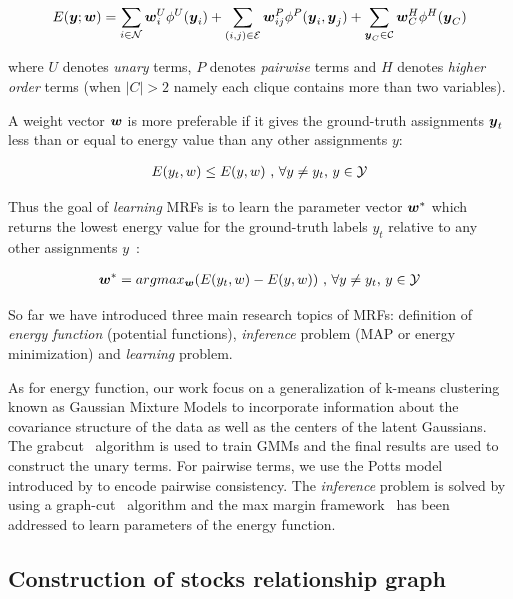\begin{align}
  \label{eq:energyfunction_UPH}
  E({\boldsymbol{y}};{\boldsymbol{w}})=\sum_{i\in {\cal N}}{{\boldsymbol{w}}_i^U\phi^U({\boldsymbol{y}}_i)}+
  \sum_{(i,j)\in {\cal E}}{{\boldsymbol{w}}_{ij}^P\phi^P({\boldsymbol{y}}_i,{\boldsymbol{y}}_j)}+
  \sum_{{\boldsymbol{y}}_C\in {\cal C}}{{\boldsymbol{w}}_C^H\phi^H({\boldsymbol{y}}_C)}
\end{align}

\noindent where $U$ denotes \emph{unary} terms, $P$ denotes
\emph{pairwise} terms and $H$ denotes \emph{higher order} terms
(when $|C|>2$ namely each clique contains more than two
variables).

A weight vector ${\boldsymbol{w}}$ is more preferable if it gives the
ground-truth assignments ${\boldsymbol{y}}_t$ less than or equal to energy
value than any other assignments $y$:

\begin{align}
E(y_t,w)\leq E(y,w)~ \text{,~}\forall y \neq y_t
\text{,~} y\in {\cal Y}
\end{align}


Thus the goal of \emph{learning} MRFs is to learn the parameter
vector ${\boldsymbol{w}}^*$ which returns the lowest energy value for the
ground-truth labels $y_t$ relative to any other assignments
$y$~\cite{Szummer:ECCV08}:

\begin{align}
{\boldsymbol{w}}^* = argmax_{{\boldsymbol{w}}}(E(y_t,w)-E(y,w))~ \text{,~}\forall y \neq y_t
\text{,~} y\in {\cal Y}
\end{align}

So far we have introduced three main research topics of MRFs:
definition of \emph{energy function} (potential functions),
\emph{inference} problem (MAP or energy minimization) and
\emph{learning} problem.

As for energy function, our work focus on a generalization of
k-means clustering known as Gaussian Mixture Models to
incorporate information about the covariance structure of the
data as well as the centers of the latent Gaussians. The
grabcut~\cite{Rother:SIGGRAPH04} algorithm is used to train GMMs
and the final results are used to construct the unary terms. For
pairwise terms, we use the Potts model introduced by
 to encode pairwise consistency. The
\emph{inference} problem is solved by using a
graph-cut~\cite{Boykov:ICCV99, Boykov:PAMI04} algorithm and the
max margin framework~\cite{tsochantaridis2005large} has been
addressed to learn parameters of the energy function.

\subsection{Construction of stocks relationship graph}
\label{sec:con_stock_graph}



